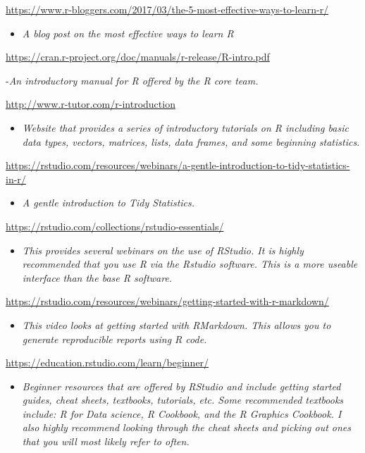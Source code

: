 \documentclass[
]{book}
\providecommand{\tightlist}{%
  \setlength{\itemsep}{0pt}\setlength{\parskip}{0pt}}
\begin{document}
\url{https://www.r-bloggers.com/2017/03/the-5-most-effective-ways-to-learn-r/}

\begin{itemize}
\tightlist
\item
  \emph{A blog post on the most effective ways to learn R}
\end{itemize}

\url{https://cran.r-project.org/doc/manuals/r-release/R-intro.pdf}

-\emph{An introductory manual for R offered by the R core team.}

\url{http://www.r-tutor.com/r-introduction}

\begin{itemize}
\tightlist
\item
  \emph{Website that provides a series of introductory tutorials on R including basic data types, vectors, matrices, lists, data frames, and some beginning statistics.}
\end{itemize}

\url{https://rstudio.com/resources/webinars/a-gentle-introduction-to-tidy-statistics-in-r/}

\begin{itemize}
\tightlist
\item
  \emph{A gentle introduction to Tidy Statistics.}
\end{itemize}

\url{https://rstudio.com/collections/rstudio-essentials/}

\begin{itemize}
\tightlist
\item
  \emph{This provides several webinars on the use of RStudio. It is highly recommended that you use R via the Rstudio software. This is a more useable interface than the base R software.}
\end{itemize}

\url{https://rstudio.com/resources/webinars/getting-started-with-r-markdown/}

\begin{itemize}
\tightlist
\item
  \emph{This video looks at getting started with RMarkdown. This allows you to generate reproducible reports using R code.}
\end{itemize}

\url{https://education.rstudio.com/learn/beginner/}

\begin{itemize}
\tightlist
\item
  \emph{Beginner resources that are offered by RStudio and include getting started guides, cheat sheets, textbooks, tutorials, etc. Some recommended textbooks include: R for Data science, R Cookbook, and the R Graphics Cookbook. I also highly recommend looking through the cheat sheets and picking out ones that you will most likely refer to often.}
\end{itemize}
\end{document}
